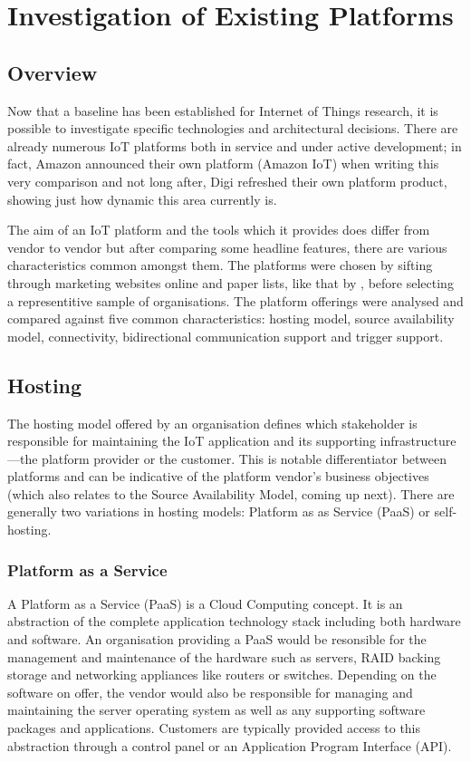  \section{Investigation of Existing Platforms}
    \subsection{Overview}
      Now that a baseline has been established for Internet of Things research, it is possible to investigate specific technologies and architectural decisions. There are already numerous IoT platforms both in service and under active development; in fact, Amazon announced their own platform (Amazon IoT) when writing this very comparison and not long after, Digi refreshed their own platform product, showing just how dynamic this area currently is.

      The aim of an IoT platform and the tools which it provides does differ from vendor to vendor but after comparing some headline features, there are various characteristics common amongst them. The platforms were chosen by sifting through marketing websites online and paper lists, like that by \citet{contemporaryIOT:2015}, before selecting a representitive sample of organisations. The platform offerings were analysed and compared against five common characteristics: hosting model, source availability model, connectivity, bidirectional communication support and trigger support.

    \subsection{Hosting}
      The hosting model offered by an organisation defines which stakeholder is responsible for maintaining the IoT application and its supporting infrastructure---the platform provider or the customer. This is notable differentiator between platforms and can be indicative of the platform vendor's business objectives (which also relates to the Source Availability Model, coming up next). There are generally two variations in hosting models: Platform as as Service (PaaS) or self-hosting.

      \subsubsection{Platform as a Service}
        A Platform as a Service (PaaS) is a Cloud Computing concept. It is an abstraction of the complete application technology stack including both hardware and software. An organisation providing a PaaS would be resonsible for the management and maintenance of the hardware such as servers, RAID backing storage and networking appliances like routers or switches. Depending on the software on offer, the vendor would also be responsible for managing and maintaining the server operating system as well as any supporting software packages and applications. Customers are typically provided access to this abstraction through a control panel or an Application Program Interface (API).

